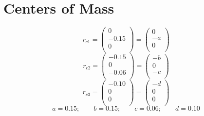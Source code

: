 \documentclass{article}
\begin{document}
\section{Centers of Mass}
\[r_{c1}=\begin{pmatrix}
0\\
-0.15\\
0\\
\end{pmatrix} = \begin{pmatrix}
0\\
-a\\
0\\
\end{pmatrix}
\]
\[r_{c2}=\begin{pmatrix}
-0.15\\
0\\
-0.06\\
\end{pmatrix} = \begin{pmatrix}
-b\\
0\\
-c\\
\end{pmatrix}
\]
\[r_{c3}=\begin{pmatrix}
-0.10\\
0\\
0\\
\end{pmatrix}=\begin{pmatrix}
-d\\
0\\
0\\
\end{pmatrix}
\]
\[a=0.15;\qquad b=0.15;\qquad c=0.06;\qquad d=0.10 
\]
\end{document}

